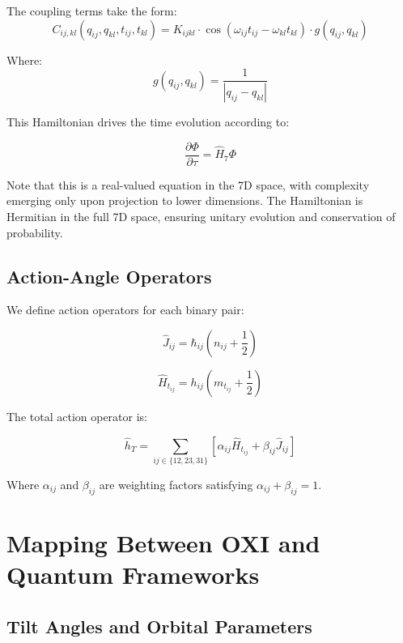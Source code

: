 \documentclass{article}
\begin{document}
The coupling terms take the form:
\begin{equation}
C_{ij,kl}(q_{ij},q_{kl},t_{ij},t_{kl}) = K_{ijkl} \cdot \cos(\omega_{ij}t_{ij} - \omega_{kl}t_{kl}) \cdot g(q_{ij},q_{kl})
\end{equation}

Where:
\begin{equation}
g(q_{ij},q_{kl}) = \frac{1}{|q_{ij} - q_{kl}|}
\end{equation}

This Hamiltonian drives the time evolution according to:

\begin{equation}
\frac{\partial \Phi}{\partial \tau} = \hat{H}_7 \Phi
\end{equation}

Note that this is a real-valued equation in the 7D space, with complexity emerging only upon projection to lower dimensions. The Hamiltonian is Hermitian in the full 7D space, ensuring unitary evolution and conservation of probability.

\subsection{Action-Angle Operators}

We define action operators for each binary pair:

\begin{equation}
\hat{J}_{ij} = \hbar_{ij}(n_{ij} + \frac{1}{2})
\end{equation}

\begin{equation}
\hat{H}_{t_{ij}} = h_{ij}(m_{t_{ij}} + \frac{1}{2})
\end{equation}

The total action operator is:

\begin{equation}
\hat{h}_T = \sum_{ij \in \{12,23,31\}} [\alpha_{ij}\hat{H}_{t_{ij}} + \beta_{ij}\hat{J}_{ij}]
\end{equation}

Where $\alpha_{ij}$ and $\beta_{ij}$ are weighting factors satisfying $\alpha_{ij} + \beta_{ij} = 1$.

\section{Mapping Between OXI and Quantum Frameworks}

\subsection{Tilt Angles and Orbital Parameters}
\end{document}
